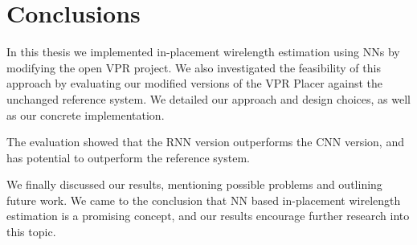 
\chapter{Conclusions}\label{ch:Conclusions}
\glsresetall %

In this thesis we implemented in-placement wirelength estimation using \glspl{NN} by modifying the open \gls{VPR} project. We also investigated the feasibility of this approach by evaluating our modified versions of the \gls{VPR} Placer against the unchanged reference system. We detailed our approach and design choices, as well as our concrete implementation.

The evaluation showed that the \gls{RNN} version outperforms the \gls{CNN} version, and has potential to outperform the reference system. 

We finally discussed our results, mentioning possible problems and outlining future work. We came to the conclusion that \gls{NN} based in-placement wirelength estimation is a promising concept, and our results encourage further research into this topic.
